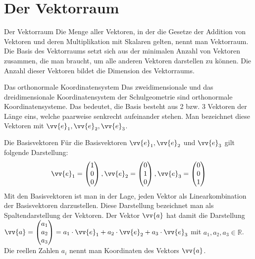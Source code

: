 \section{Der Vektorraum}
\begin{defi}{Der Vektorraum}{}
    Die Menge aller Vektoren, in der die Gesetze der Addition von Vektoren und deren Multiplikation mit Skalaren gelten, nennt man Vektorraum. Die Basis des Vektorraums setzt sich aus der minimalen Anzahl von Vektoren zusammen, die man braucht, um alle anderen Vektoren darstellen zu können. Die Anzahl dieser Vektoren bildet die Dimension des Vektorraums.
\end{defi}
\begin{merke}{Das orthonormale Koordinatensystem}{}
    Das zweidimensionale und das dreidimensionale Koordinatensystem der Schulgeometrie sind orthonormale Koordinatensysteme. Das bedeutet, die Basis besteht aus 2 bzw. 3 Vektoren der Länge eins, welche paarweise senkrecht aufeinander stehen. Man bezeichnet diese Vektoren mit $\vv{e}_1, \vv{e}_2, \vv{e}_3$. 
\end{merke}
\begin{b8d}{Die Basisvektoren}{}
Für die Basisvektoren $\vv{e}_1, \vv{e}_2$ und $\vv{e}_3$ gilt folgende Darstellung:\\
$$\vv{e}_1 =\begin{pmatrix} 1 \\ 0 \\0 \end{pmatrix}, 
\vv{e}_2 =\begin{pmatrix} 0 \\ 1 \\0 \end{pmatrix}, 
\vv{e}_3 =\begin{pmatrix} 0 \\ 0 \\1 \end{pmatrix}$$
Mit den Basisvektoren ist man in der Lage, jeden Vektor als Linearkombination der Basisvektoren darzustellen. Diese Darstellung bezeichnet man als Spaltendarstellung der Vektoren. Der Vektor $\vv{a}$ hat damit die Darstellung $\vv{a} = \begin{pmatrix} a_1 \\ a_2 \\a_3 \end{pmatrix} = a_1\cdot \vv{e}_1 + a_2 \cdot \vv{e}_2 + a_3\cdot \vv{e}_3$ mit $a_1, a_2, a_3 \in \mathds{R}$. Die reellen Zahlen $a_i$ nennt man Koordinaten des Vektors $\vv{a}$.  
\end{b8d}
